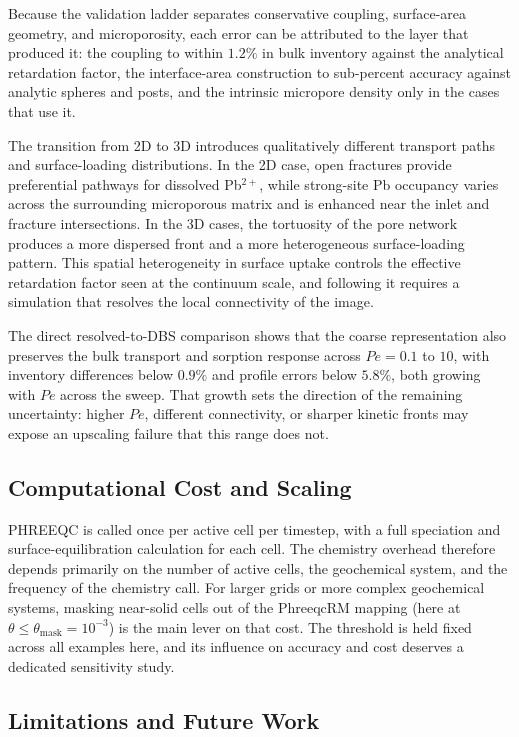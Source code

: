 Because the validation ladder separates conservative coupling, surface-area
geometry, and microporosity, each error can be attributed to the layer that
produced it: the coupling to within $1.2\%$ in bulk inventory against the
analytical retardation factor, the interface-area construction to sub-percent
accuracy against analytic spheres and posts, and the intrinsic micropore
density only in the cases that use it.

The transition from 2D to 3D introduces qualitatively different transport paths
and surface-loading distributions. In the 2D case, open fractures provide
preferential pathways for dissolved Pb$^{2+}$, while strong-site Pb occupancy
varies across the surrounding microporous matrix and is enhanced near the inlet
and fracture intersections. In the 3D cases, the tortuosity of the
pore network produces a more dispersed front and a more heterogeneous
surface-loading pattern. This spatial heterogeneity in surface uptake controls the effective retardation
factor seen at the continuum scale, and following it requires a simulation that
resolves the local connectivity of the image.

The direct resolved-to-DBS comparison shows that the coarse representation also
preserves the bulk transport and sorption response across $Pe = 0.1$ to $10$,
with inventory differences below $0.9\%$ and profile errors below $5.8\%$, both
growing with $Pe$ across the sweep. That growth sets the direction of the
remaining uncertainty: higher $Pe$, different connectivity, or sharper kinetic
fronts may expose an upscaling failure that this range does not.

\subsection{Computational Cost and Scaling}

PHREEQC is called once per active cell per timestep, with a full speciation
and surface-equilibration calculation for each cell. The chemistry overhead
therefore depends primarily on the number of active cells, the geochemical
system, and the frequency of the chemistry call. For larger grids or more complex geochemical systems, masking near-solid cells
out of the PhreeqcRM mapping (here at
$\theta \le \theta_{\mathrm{mask}} = 10^{-3}$) is the main lever on that cost.
The threshold is held fixed across all examples here, and its influence on
accuracy and cost deserves a dedicated sensitivity study.

\subsection{Limitations and Future Work}

